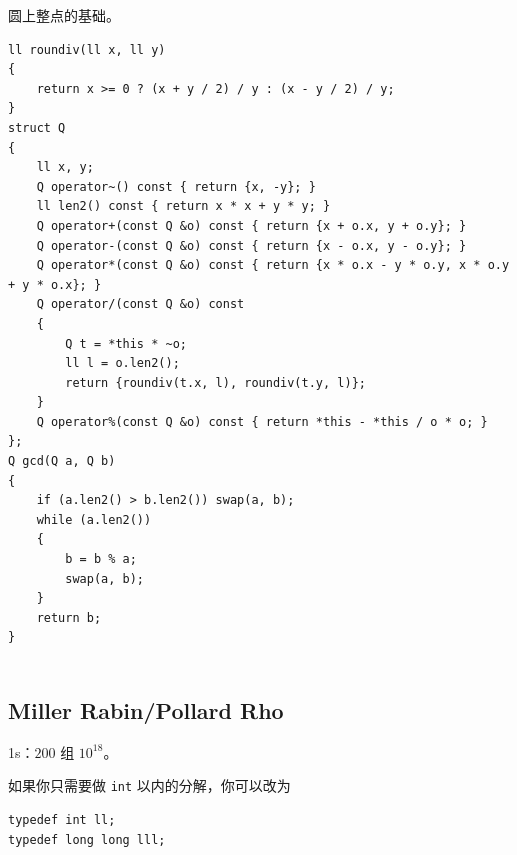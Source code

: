 \documentclass[12pt]{ctexart}
\begin{document}
圆上整点的基础。

\begin{lstlisting}
ll roundiv(ll x, ll y)
{
	return x >= 0 ? (x + y / 2) / y : (x - y / 2) / y;
}
struct Q
{
	ll x, y;
	Q operator~() const { return {x, -y}; }
	ll len2() const { return x * x + y * y; }
	Q operator+(const Q &o) const { return {x + o.x, y + o.y}; }
	Q operator-(const Q &o) const { return {x - o.x, y - o.y}; }
	Q operator*(const Q &o) const { return {x * o.x - y * o.y, x * o.y + y * o.x}; }
	Q operator/(const Q &o) const
	{
		Q t = *this * ~o;
		ll l = o.len2();
		return {roundiv(t.x, l), roundiv(t.y, l)};
	}
	Q operator%(const Q &o) const { return *this - *this / o * o; }
};
Q gcd(Q a, Q b)
{
	if (a.len2() > b.len2()) swap(a, b);
	while (a.len2())
	{
		b = b % a;
		swap(a, b);
	}
	return b;
}


\end{lstlisting}

\subsection{Miller Rabin/Pollard Rho}

1s：$200$ 组 $10^{18}$。

如果你只需要做 \verb|int| 以内的分解，你可以改为

\begin{lstlisting}
typedef int ll;
typedef long long lll;
\end{lstlisting}
\end{document}
